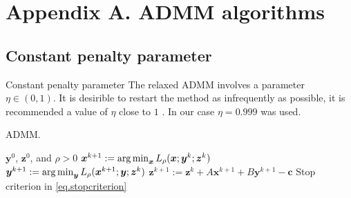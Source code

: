\documentclass[8pt,red]{beamer}
\theoremstyle{plain}
\theoremstyle{definition}
\theoremstyle{remark}
\newcommand{\argmin}{\operatornamewithlimits{\mathrm{arg\,min}}}
\newcommand{\bi}[1]{\ensuremath{\boldsymbol{#1}}}
\begin{document}
\section*{Appendix A. ADMM algorithms}

\subsection{Constant penalty parameter}
\begin{frame}{Constant penalty parameter}
The relaxed ADMM involves a parameter $\eta \in (0,1)$. It is desirible to restart the method as infrequently as possible, it is recommended a value of $\eta$ close to $1$ \citep{goldstein2014fast}. In our case $\eta = 0.999$ was used.

\begin{algorithm}[H]
  \scriptsize
  \caption{ADMM.}
  \label{alg:prototype.cp-N}
  \begin{algorithmic}[1]
    \Require
    $\bi{y}^{0}$, $\bi{z}^{0}$, and $\rho > 0$ 
    \State
    $\bi{x}^{k+1} 
    := \argmin_{\bi{x}} L_{\rho}(\bi{x};\bi{y}^{k};{\bi{z}}^{k})$ 
    \State
    $\bi{y}^{k+1} 
    := \argmin_{\bi{y}} L_{\rho}(\bi{x}^{k+1};\bi{y};{\bi{z}}^{k})$ 
    \State
    $\bi{z}^{k+1} 
  := \bi{z}^{k} + A \bi{x}^{k+1} + B \bi{y}^{k+1} - \bi{c}$ 
    \State
    Stop criterion in \eqref{eq.stopcriterion}
    \EndFor
  \end{algorithmic}
\end{algorithm}
\end{frame}
\end{document}
